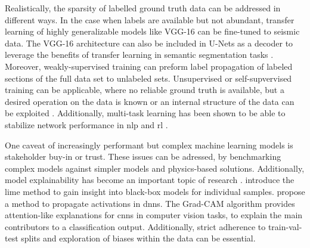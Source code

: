 Realistically, the sparsity of labelled ground truth data can be addressed in different ways. In the case when labels are available but not abundant, transfer learning of highly generalizable models like VGG-16 can be fine-tuned to seismic data. The VGG-16 architecture can also be included in U-Nets as a decoder to leverage the benefits of transfer learning in semantic segmentation tasks \citep{dramsch2018deep}. Moreover, weakly-supervised training can preform label propagation of labeled sections of the full data set to unlabeled sets. Unsupervised or self-supvervised training can be applicable, where no reliable ground truth is available, but a desired operation on the data is known or an internal structure of the data can be exploited \citep{dramsch20193dwarping}. Additionally, multi-task learning has been shown to be able to stabilize network performance in \acl{nlp} \citep{liu2019multi} and \acl{rl} \citep{yu2019meta}.


One caveat of increasingly performant but complex machine learning models is stakeholder buy-in or trust. These issues can be adressed, by benchmarking complex models against simpler models and physics-based solutions. Additionally, model explainability has become an important topic of research \citep{NIPS2017_7062}. \citet{ribeiro2016should} introduce the \acf{lime} method to gain insight into black-box models for individual samples. \citet{shrikumar2017learning} propose a method to propagate activations in \aclp{dnn}. The Grad-CAM algorithm \citep{selvaraju2017grad} provides attention-like explanations for \acp{cnn} in computer vision tasks, to explain the main contributors to a classification output. Additionally, strict adherence to train-val-test splits and exploration of biases within the data can be essential. 



